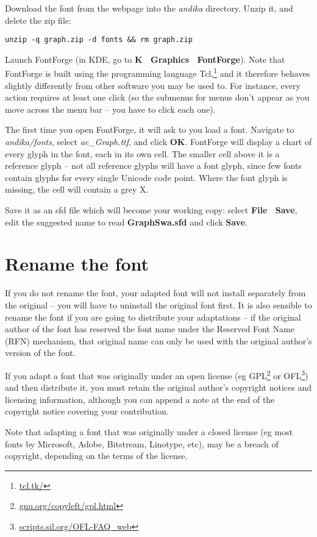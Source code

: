 Download the font from the webpage into the \textit{andika} directory.  Unzip it, and delete the zip file:

\verb|unzip -q graph.zip -d fonts && rm graph.zip|

Launch FontForge (in KDE, go to \textbf{K \textrightarrow\ Graphics \textrightarrow\ FontForge}).  Note that FontForge is built using the programming language Tcl,\footnote{\url{tcl.tk/}} and it therefore behaves slightly differently from other software you may be used to.  For instance, every action requires at least one click (so the submenus for menus don't appear as you move across the menu bar -- you have to click each one).

The first time you open FontForge, it will ask to you load a font.  Navigate to \textit{andika/fonts}, select \textit{ae\_Graph.ttf}, and click \textbf{OK}.  FontForge will display a chart of every glyph in the font, each in its own cell.  The smaller cell above it is a reference glyph -- not all reference glyphs will have a font glyph, since few fonts contain glyphs for every single Unicode code point.  Where the font glyph is missing, the cell will contain a grey X.

Save it as an sfd file which will become your working copy: select \textbf{File \textrightarrow\ Save}, edit the suggested name to read \textbf{GraphSwa.sfd} and click \textbf{Save}.

\section{Rename the font}

If you do not rename the font, your adapted font will not install separately from the original -- you will have to uninstall the original font first.  It is also sensible to rename the font if you are going to distribute your adaptations -- if the original author of the font has reserved the font name under the Reserved Font Name (RFN) mechanism, that original name can only be used with the original author's version of the font.

If you adapt a font that was originally under an open license (eg GPL\footnote{\url{gnu.org/copyleft/gpl.html}} or OFL\footnote{\url{scripts.sil.org/OFL-FAQ_web}}) and then distribute it, you must retain the original author's copyright notices and licensing information, although you can append a note at the end of the copyright notice covering your contribution.

Note that adapting a font that was originally under a closed license (eg most fonts by Microsoft, Adobe, Bitstream, Linotype, etc), may be a breach of copyright, depending on the terms of the license.

